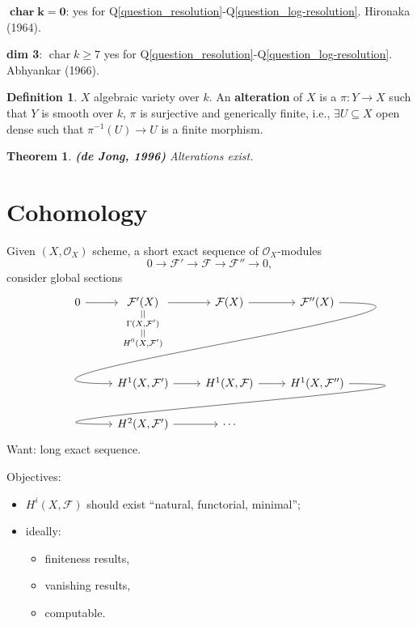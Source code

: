 \documentclass[12pt]{article}
\DeclareMathOperator{\chara}{char}
\newtheorem*{theorem}{Theorem}
\theoremstyle{definition}
\newtheorem*{definition}{Definition}
\theoremstyle{remark}
\begin{document}
$\boldsymbol{\chara k=0}$: yes for Q\ref{question_resolution}-Q\ref{question_log-resolution}. Hironaka (1964).

\textbf{dim 3}: $\chara k\geq7$ yes for Q\ref{question_resolution}-Q\ref{question_log-resolution}. Abhyankar (1966).

\begin{definition}
$X$ algebraic variety over $k$. An \textbf{alteration} of $X$ is a $\pi:Y\rightarrow X$ such that $Y$ is smooth over $k$, $\pi$ is surjective and generically finite, i.e., $\exists U\subseteq X$ open dense such that $\pi^{-1}(U)\rightarrow U$ is a finite morphism.
\end{definition}

\begin{theorem}
\emph{\textbf{(de Jong, 1996)}} Alterations exist.
\end{theorem}

\section{Cohomology}
Given $(X,\mathcal{O}_X)$ scheme, a short exact sequence of $\mathcal{O}_X$-modules
\[0\longrightarrow\mathcal{F}'\longrightarrow\mathcal{F}\longrightarrow\mathcal{F}''\longrightarrow0,\]
consider global sections
\[
\begin{tikzcd}
0\arrow[r]&\underset{\substack{||\\\Gamma(X,\mathcal{F}')\\||\\H^0(X,\mathcal{F}')}}{\mathcal{F}'(X)}\arrow[r]&\mathcal{F}(X)\arrow[r]&\mathcal{F}''(X)\arrow[out=0,in=180,looseness=2,overlay,lld]\\
&H^1(X,\mathcal{F}')\arrow[r]&H^1(X,\mathcal{F})\arrow[r]&H^1(X,\mathcal{F}'')\arrow[out=0,in=180, looseness=2,overlay,lld]\\
&H^2(X,\mathcal{F}')\arrow[r]&\cdots
\end{tikzcd}
\]
Want: long exact sequence.

Objectives:
\begin{itemize}[label=$-$]
\item $H^i(X,\mathcal{F})$ should exist ``natural, functorial, minimal'';
\item ideally:
\begin{itemize}[label=$-$]
\item finiteness results,
\item vanishing results,
\item computable.
\end{itemize}
\end{itemize}
\end{document}
